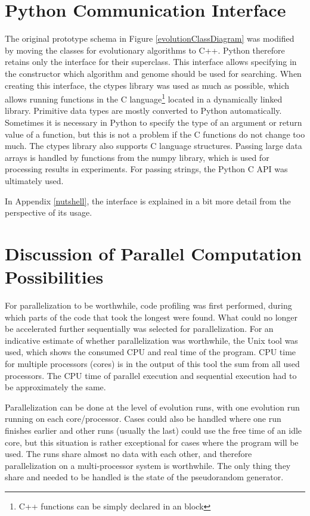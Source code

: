 \section{Python Communication Interface}
The original prototype schema in Figure \ref{evolutionClassDiagram} was modified by
moving the classes for evolutionary algorithms to C++. Python therefore retains only the interface
for their superclass. This interface allows specifying in the constructor which algorithm
and genome should be used for searching.
When creating this interface, the ctypes library was used as much as possible, which allows
running functions in
the C language\footnote{C++ functions can be simply declared in an
 block}
located in a dynamically linked library. Primitive data types are
mostly converted to Python automatically. Sometimes it is necessary in Python to specify the type
of an argument or return value of a function, but this is not a problem if
the C functions do not change too much. The ctypes library
also supports C language structures.
Passing large data arrays is handled by
functions from the numpy library, which is used for processing results in experiments.
For passing strings, the Python C API was ultimately used.

In Appendix \ref{nutshell}, the interface is explained in a bit more detail from the perspective of its usage.

\section{Discussion of Parallel Computation Possibilities}
For parallelization to be worthwhile, code profiling was first performed,
during which parts of the code that took
the longest were found. What could no longer be accelerated further sequentially was selected for parallelization.
For an indicative estimate of whether parallelization was worthwhile, the
Unix tool  was used, which shows the consumed CPU
and real time of the program. CPU time for multiple processors (cores) is in
the output of this tool the sum from all used processors.
The CPU time of parallel execution and sequential execution had to be approximately the same.

Parallelization can be done at the level of evolution runs, with one evolution run running on each core/processor. Cases could also be handled where one run
finishes earlier and other runs (usually the last) could use the free time of an idle core, but this situation is rather exceptional for cases where
the program will be used. The runs share almost
no data with each other, and therefore parallelization on a multi-processor system is worthwhile. The only
thing they share and needed to be handled is the state of the pseudorandom generator.

